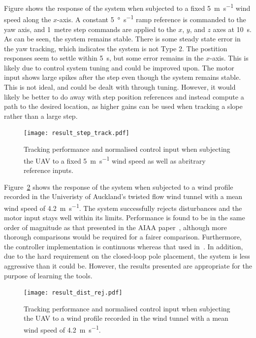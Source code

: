 \documentclass[a4paper,12pt]{article}
\begin{document}
        Figure shows the response of the system when subjected to a fixed \SI{5}{\metre\per\second} wind speed along the \(x\)-axis. A constant \SI{5}{\degree\per\second} ramp reference is commanded to the yaw axis, and \SI{1}{metre} step commands are applied to the \(x\), \(y\), and \(z\) axes at \SI{10}{\second}. As can be seen, the system remains stable. There is some steady state error in the yaw tracking, which indicates the system is not Type 2. The postition responses seem to settle within \SI{5}{\second}, but some error remains in the \(x\)-axis. This is likely due to control system tuning and could be improved upon. The motor input shows large spikes after the step even though the system remains stable. This is not ideal, and could be dealt with through tuning. However, it would likely be better to do away with step position references and instead compute a path to the desired location, as higher gains can be used when tracking a slope rather than a large step.

        \begin{figure}[h!]
            \centering%
            \texttt{[image: result\_step\_track.pdf]}
            \caption{Tracking performance and normalised control input when subjecting the UAV to a fixed \SI{5}{\metre\per\second} wind speed as well as abritrary reference inputs.}\label{fig:result_step_track}
        \end{figure}

        Figure~\ref{fig:result_dist_rej} shows the response of the system when subjected to a wind profile recorded in the Univeristy of Auckland's twisted flow wind tunnel with a mean wind speed of \SI{4.2}{\metre\per\second}. The system successfully rejects disturbances and the motor input stays well within its limits. Performance is found to be in the same order of magnitude as that presented in the AIAA paper~\cite{BannwarthEtAl2018}, although more thorough comparisons would be required for a fairer comparison. Furthermore, the controller implementation is continuous whereas that used in~\cite{BannwarthEtAl2018}. In addition, due to the hard requirement on the closed-loop pole placement, the system is less aggressive than it could be. However, the results presented are appropriate for the purpose of learning the tools.

        \begin{figure}[h!]
            \centering%
            \texttt{[image: result\_dist\_rej.pdf]}
            \caption{Tracking performance and normalised control input when subjecting the UAV to a wind profile recorded in the wind tunnel with a mean wind speed of \SI{4.2}{\metre\per\second}.}\label{fig:result_dist_rej}
        \end{figure}
\end{document}
